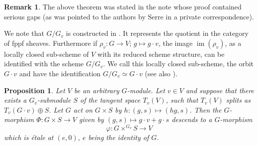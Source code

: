 \documentclass[11pt,a4paper]{article}
\theoremstyle{plain}
\newtheorem{proposition}[theorem]{Proposition}
\theoremstyle{definition}
\newtheorem{remark}[theorem]{Remark}
\DeclareMathOperator{\im}{im}
\begin{document}
\begin{remark} \label{rem:5.2}
The above theorem was stated in the note \cite{MP} whose proof contained serious gaps (as was pointed to the authors by Serre in a private correspondence).
\end{remark}

We note that $G/G_v$ is constructed in \cite[III, Proposition~3.5.2]{DG}. It represents the quotient in the category of fppf sheaves. Furthermore if $\rho_v : G \to V$; $g \mapsto g \cdot v$, the image $\im(\rho_v)$, as a locally closed sub-scheme of $V$ with its reduced scheme structure, can be identified with the scheme $G/G_v$. We call this locally closed sub-scheme, the orbit $G \cdot v$ and have the identification $G/G_v \simeq G \cdot v$ (see also \cite[Proposition and Definition~1.6, III, \S3, page~325]{DG}).

\begin{proposition} \label{prop:5.3}
Let $V$ be an arbitrary $G$-module. Let $v \in V$ and suppose that there exists a $G_v$-submodule $S$ of the tangent space $T_v(V)$, such that $T_v(V)$ splits as $T_v(G \cdot v) \oplus S$. Let $G$ act on $G \times S$ by $h : (g, s) \mapsto (hg, s)$. Then the $G$-morphism $\Phi : G \times S \to V$ given by $(g, s) \mapsto g \cdot v + g \cdot s$ descends to a $G$-morphism
\begin{equation} \label{eq:5.3.1}
\varphi : G \times^{G_v} S \to V
\end{equation}
which is \'etale at $(e, 0)$, $e$ being the identity of $G$.
\end{proposition}
\end{document}
